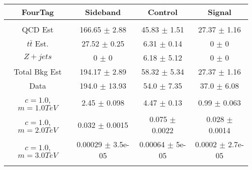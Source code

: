 \begin{footnotesize} 
\begin{tabular}{c|c|c|c} 
FourTag & Sideband & Control & Signal \\ 
\hline\hline 
& & & \\ 
QCD Est & 166.65 $\pm$ 2.88 & 45.83 $\pm$ 1.51 & 27.37 $\pm$ 1.16\\ 
$t\bar{t}$ Est.  & 27.52 $\pm$ 0.25 & 6.31 $\pm$ 0.14 & 0 $\pm$ 0\\ 
$Z+jets$ & 0 $\pm$ 0 & 6.18 $\pm$ 5.12 & 0 $\pm$ 0\\ 
Total Bkg Est & 194.17 $\pm$ 2.89 & 58.32 $\pm$ 5.34 & 27.37 $\pm$ 1.16\\ 
Data & 194.0 $\pm$ 13.93 & 54.0 $\pm$ 7.35 & 37.0 $\pm$ 6.08\\ 
$c=1.0$,$m=1.0TeV$ & 2.45 $\pm$ 0.098 & 4.47 $\pm$ 0.13 & 0.99 $\pm$ 0.063\\ 
$c=1.0$,$m=2.0TeV$ & 0.032 $\pm$ 0.0015 & 0.075 $\pm$ 0.0022 & 0.028 $\pm$ 0.0014\\ 
$c=1.0$,$m=3.0TeV$ & 0.00029 $\pm$ 3.5e-05 & 0.00064 $\pm$ 5e-05 & 0.0002 $\pm$ 2.7e-05\\ 
& & & \\ 
\hline\hline 
\end{tabular} 
\end{footnotesize} 
\newline 
